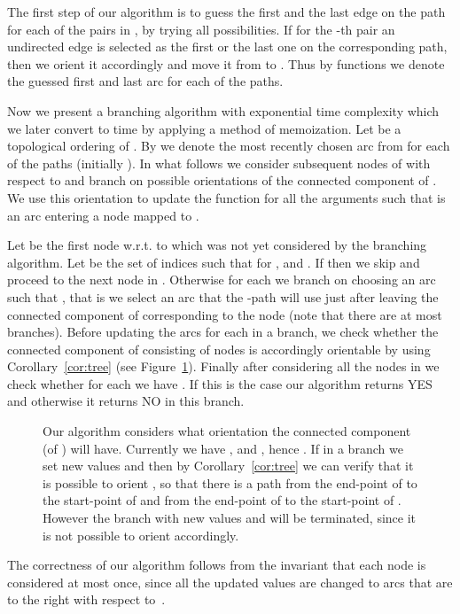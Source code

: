 \documentclass[envcountsame]{llncs}
\begin{document}
The first step of our algorithm is to guess the first and the last edge
on the path for each of the  pairs in , by trying all  possibilities.
If for the -th pair an undirected edge is selected as the first or the last one
on the corresponding path, then we orient it accordingly and move it from  to .
Thus by functions  we denote
the guessed first and last arc for each of the  paths.

Now we present a branching algorithm with exponential time complexity
which we later convert to  time by applying a method of memoization.
Let  be a topological ordering of .
By  we denote the most recently chosen
arc from  for each of the  paths (initially ).
In what follows we consider subsequent nodes  of  with respect to 
and branch on possible orientations of the connected component  of .
We use this orientation to update the function  for all the arguments 
such that  is an arc entering a node mapped to .

Let  be the first node w.r.t. to 
which was not yet considered by the branching algorithm.
Let  be the set of indices  such that  for ,
and .
If  then we skip  and proceed to the next node in .
Otherwise for each  we branch on choosing an arc  such that ,
that is we select an arc that the -path will use just after leaving the connected component of 
corresponding to the node  (note that there are at most  branches).
Before updating the arcs  for each  in a branch, we check whether the connected component 
of  consisting of nodes  is accordingly orientable by using Corollary~\ref{cor:tree} (see Figure~\ref{fig:zoom}).
Finally after considering all the nodes in  we check whether for each  
we have .
If this is the case our algorithm returns YES and otherwise it returns NO in this branch.

\begin{figure} 
\centering 
\epsfysize=3.1cm
   \caption{Our algorithm considers what orientation the connected component  (of )
will have. Currently we have ,  and , hence .
If in a branch we set new values  and  then by Corollary~\ref{cor:tree} we can
verify that it is possible to orient , so that there is a path from the end-point 
of  to the start-point of  and from the end-point of  to the start-point of .
However the branch with new values  and  will be terminated,
since it is not possible to orient  accordingly.}
\label{fig:zoom}
\end{figure}

The correctness of our algorithm follows from the invariant that each node  is considered
at most once, since all the updated values  are changed to arcs that are
to the right with respect to~.
\end{document}
